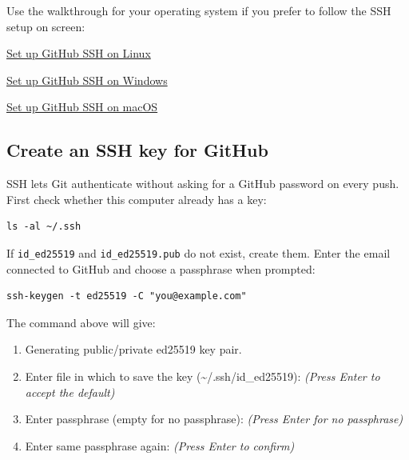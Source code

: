 Use the walkthrough for your operating system if you prefer to follow the SSH
setup on screen:

\begin{tcolorbox}[
  enhanced,
  breakable,
  colback=UTPPaleOrange,
  colframe=UTPOrange,
  colbacktitle=UTPOrange,
  boxrule=1pt,
  arc=2mm,
  title={Choose your operating system},
  fonttitle=\bfseries\color{white},
  left=3mm,right=3mm,top=2mm,bottom=2mm
]
\begin{description}[leftmargin=1.15in,style=nextline]
  \item[Linux]
    \href{https://youtu.be/AOM8CEyu3Ug?t=121}{Set up GitHub SSH on Linux}
  \item[Windows]
    \href{https://youtu.be/YT5YimhyX18?t=5}{Set up GitHub SSH on Windows}
  \item[macOS]
    \href{https://youtu.be/ACvE5Uy7ZB0?t=437}{Set up GitHub SSH on macOS}
\end{description}
\end{tcolorbox}

\pagebreak
\subsection{Create an SSH key for GitHub}

SSH lets Git authenticate without asking for a GitHub password on every push.
First check whether this computer already has a key:

\begin{lstlisting}[style=utpterminal]
ls -al ~/.ssh
\end{lstlisting}

If \texttt{id\_ed25519} and \texttt{id\_ed25519.pub} do not exist, create them.
Enter the email connected to GitHub and choose a passphrase when prompted:

\begin{lstlisting}[style=utpterminal]
ssh-keygen -t ed25519 -C "you@example.com"
\end{lstlisting}

The command above will give:

\begin{enumerate}[leftmargin=1.7em]
  \item Generating public/private ed25519 key pair.
  \item Enter file in which to save the key (\textasciitilde/.ssh/id\_ed25519): \textit{(Press Enter to accept the default)}
  \item Enter passphrase (empty for no passphrase): \textit{(Press Enter for no passphrase)}
  \item Enter same passphrase again: \textit{(Press Enter to confirm)}
\end{enumerate}

